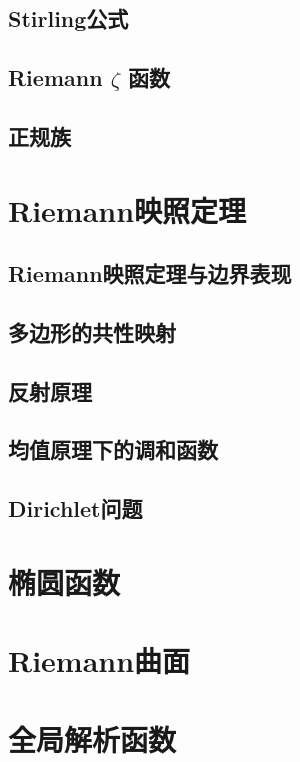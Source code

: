 \documentclass[UTF8]{ctexart}
\begin{document}
\subsection{Stirling公式}
\subsection{Riemann  \( \zeta \)  函数}
\subsection{正规族}
\section{Riemann映照定理}
\subsection{Riemann映照定理与边界表现}
\subsection{多边形的共性映射}
\subsection{反射原理}
\subsection{均值原理下的调和函数}
\subsection{Dirichlet问题}
\section{椭圆函数}
\section{Riemann曲面}
\section{全局解析函数}
\end{document}
